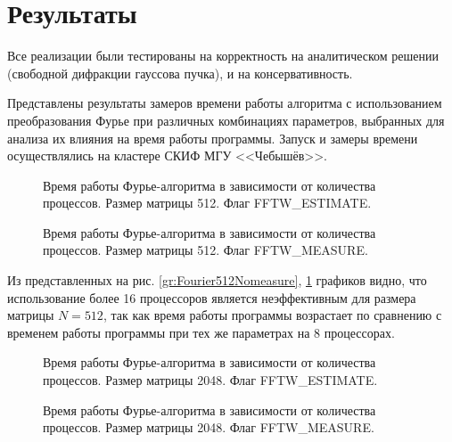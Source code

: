 \section{Результаты}

Все реализации были тестированы на корректность на аналитическом решении (свободной дифракции гауссова пучка),
и на консервативность.

Представлены результаты замеров времени работы алгоритма с использованием преобразования Фурье при различных комбинациях параметров, выбранных для анализа их влияния на время работы программы.
Запуск и замеры времени осуществлялись на кластере СКИФ МГУ <<Чебышёв>>.

    \begin{figure}[h!]
        \begin{center}
            \begin{minipage}{0.45\linewidth}
                \caption{Время работы Фурье-алгоритма в зависимости от количества процессов. Размер матрицы 512. Флаг FFTW\_ESTIMATE.}
                \label{gr:Fourier512Nomeasure}
            \end{minipage}
            \hfill
            \begin{minipage}{0.45\linewidth}
                \caption{Время работы Фурье-алгоритма в зависимости от количества процессов. Размер матрицы 512. Флаг FFTW\_MEASURE.}
                \label{gr:Fourier512Measure}
            \end{minipage}
        \end{center}
    \end{figure}

Из представленных на рис. \ref{gr:Fourier512Nomeasure}, \ref{gr:Fourier512Measure} графиков видно, что использование более 16 процессоров является неэффективным для размера матрицы $N = 512$, так как время работы программы возрастает по сравнению с временем работы программы при тех же параметрах на 8 процессорах.

	\begin{figure}[h!]
		\begin{center}
    		\begin{minipage}{0.48\linewidth}
                \caption{Время работы Фурье-алгоритма в зависимости от количества процессов. Размер матрицы 2048. Флаг FFTW\_ESTIMATE.}
                \label{gr:Fourier2048Nomeasure}
			\end{minipage}
			\hfill
			\begin{minipage}{0.48\linewidth}
                \caption{Время работы Фурье-алгоритма в зависимости от количества процессов. Размер матрицы 2048. Флаг FFTW\_MEASURE.}
                \label{gr:Fourier2048Measure}
			\end{minipage}
		\end{center}
	\end{figure}

